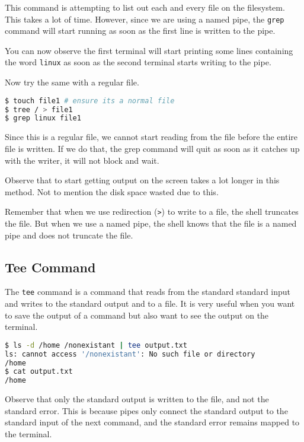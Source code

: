 This command is attempting to list out each and every file on
the filesystem. This takes a lot of time. However, since
we are using a named pipe, the \texttt{grep} command will start
running as soon as the first line is written to the pipe.

You can now observe the first terminal will start printing
some lines containing the word \texttt{linux} as soon as the
second terminal starts writing to the pipe.

Now try the same with a regular file.

\begin{lstlisting}[language=bash]
$ touch file1 # ensure its a normal file
$ tree / > file1
$ grep linux file1
\end{lstlisting}

Since this is a regular file, we cannot start reading from the
file before the entire file is written. If we do that, the grep
command will quit as soon as it catches up with the writer, it
will not block and wait.

Observe that to start getting output on the screen takes a lot
longer in this method. Not to mention the disk space wasted
due to this.

\begin{remark}
  Remember that when we use redirection (\texttt{>}) to write to a file,
  the shell truncates the file. But when we use a named pipe, the shell
  knows that the file is a named pipe and does not truncate the file.
\end{remark}

\subsection{Tee Command}

The \texttt{tee} command is a command that reads from the standard
standard input and writes to the standard output and to a file.
It is very useful when you want to save the output of a command
but also want to see the output on the terminal.

\begin{lstlisting}[language=bash]
$ ls -d /home /nonexistant | tee output.txt
ls: cannot access '/nonexistant': No such file or directory
/home
$ cat output.txt
/home
\end{lstlisting}

Observe that only the standard output is written to the file, and
not the standard error. This is because pipes only connect the
standard output to the standard input of the next command, and the
standard error remains mapped to the terminal.

